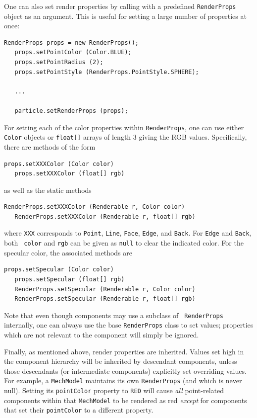 One can also set render properties by calling
 with a
predefined {\tt RenderProps} object as an argument. This is useful for
setting a large number of properties at once:
%
\begin{lstlisting}[]
   RenderProps props = new RenderProps();
   props.setPointColor (Color.BLUE);
   props.setPointRadius (2);
   props.setPointStyle (RenderProps.PointStyle.SPHERE);

   ...

   particle.setRenderProps (props);
\end{lstlisting}

For setting each of the color properties within {\tt RenderProps},
one can use either {\tt Color} objects or {\tt float[]} arrays
of length 3 giving the RGB values. Specifically, there
are methods of the form
%
\begin{lstlisting}[]
   props.setXXXColor (Color color)
   props.setXXXColor (float[] rgb)
\end{lstlisting}
%
as well as the static methods
%
\begin{lstlisting}[]
   RenderProps.setXXXColor (Renderable r, Color color)
   RenderProps.setXXXColor (Renderable r, float[] rgb)
\end{lstlisting}
%
where {\tt XXX} corresponds to {\tt Point}, {\tt Line}, {\tt Face},
{\tt Edge}, and {\tt Back}. For {\tt Edge} and {\tt Back}, both {\tt
color} and {\tt rgb} can be given as {\tt null} to clear the indicated
color. For the specular color, the associated methods are
%
\begin{lstlisting}[]
   props.setSpecular (Color color)
   props.setSpecular (float[] rgb)
   RenderProps.setSpecular (Renderable r, Color color)
   RenderProps.setSpecular (Renderable r, float[] rgb)
\end{lstlisting}
%

\begin{sideblock}
Note that even though components may use a subclass of {\tt
RenderProps} internally, one can always use the base {\tt RenderProps}
class to set values; properties which are not relevant to the
component will simply be ignored.
\end{sideblock}

Finally, as mentioned above, render properties are inherited.  Values
set high in the component hierarchy will be inherited by descendant
components, unless those descendants (or intermediate components)
explicitly set overriding values.  For example, a {\tt MechModel}
maintains its own {\tt RenderProps} (and which is never null). Setting
its {\tt pointColor} property to {\tt RED} will cause {\it all}
point-related components within that {\tt MechModel} to be rendered as
red {\it except} for components that set their {\tt pointColor} to a
different property.

